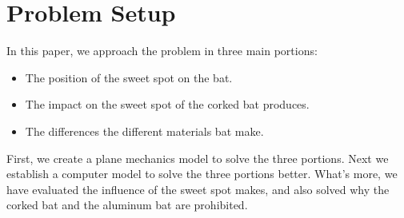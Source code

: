 \section{Problem Setup}

In this paper, we approach the problem in three main portions:

\begin{itemize}

\item The position of the sweet spot on the bat.

\item The impact on the sweet spot of the corked bat produces.

\item The differences the different materials bat make.
\end{itemize}

First, we create a plane mechanics model to solve the three portions. Next we establish a computer model to solve the three portions better. What's more, we have evaluated the influence of the sweet spot makes, and also solved why the corked bat and the aluminum bat are prohibited.
